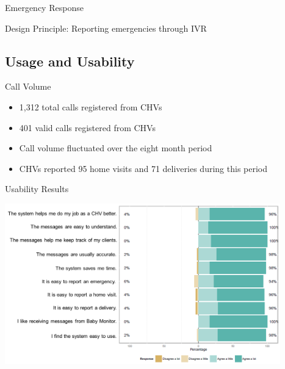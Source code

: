 \documentclass[xcolor=x11names, handout, compress]{beamer}
\renewcommand{\(}{\begin{columns}}
\renewcommand{\)}{\end{columns}}
\newcommand{\<}[1]{\begin{column}{#1}}
\renewcommand{\>}{\end{column}}
\begin{document}
\begin{frame}[t]{Emergency Response}
\begin{block}{\textcolor{IndianRed2}{Design Principle: Reporting emergencies through IVR}}
\end{block}
\end{frame}


\subsection{Usage and Usability}
\begin{frame}{Call Volume}
\begin{itemize}
\item{1,312 total calls registered from CHVs}
\item{401 valid calls registered from CHVs}
\item{Call volume fluctuated over the eight month period}
\item{CHVs reported 95 home visits and 71 deliveries during this period}
\end{itemize}
\end{frame}

\begin{frame}{Usability Results}
\centerline{\includegraphics[width=4.7in]{Picture3}}
\end{frame}

\end{document}
